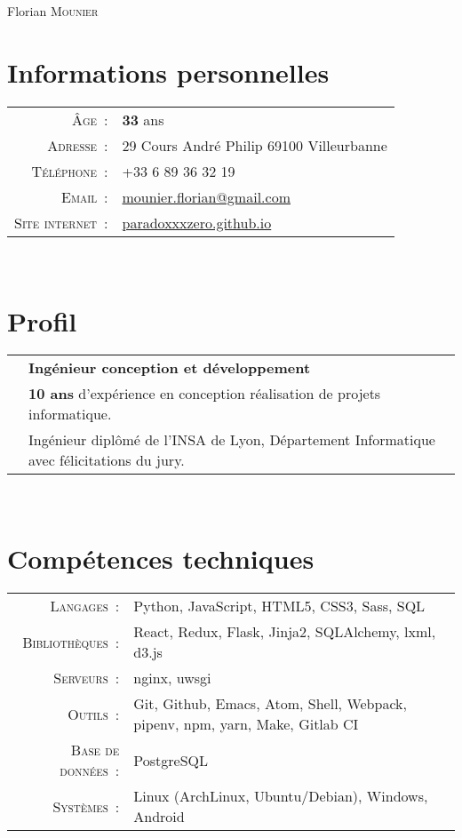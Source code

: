 \documentclass[a4paper,10pt]{article}
\begin{document}
\pagestyle{empty}
\par{\centering
  {\Huge Florian \textsc{Mounier}
  }\bigskip\par}

\section{Informations personnelles}
\begin{tabular}{rl}
  \textsc{Âge :}           & \textbf{33} ans \\
  \textsc{Adresse :}       & 29 Cours André Philip 69100 Villeurbanne \\
  \textsc{Téléphone :}     & +33 6 89 36 32 19 \\
  \textsc{Email :}         & \href{mailto:mounier.florian@gmail.com}{mounier.florian@gmail.com} \\
  \textsc{Site internet :} & \href{http://paradoxxxzero.github.com}{paradoxxxzero.github.io} \\
\end{tabular} \\

\section{Profil}
\begin{tabular}{rl}
  & \textbf {Ingénieur conception et développement} \\
  & \textbf{10 ans} d’expérience en conception réalisation de projets informatique. \\
  & Ingénieur diplômé de l’INSA de Lyon, Département Informatique avec félicitations du jury. \\
\end{tabular} \\

\section{Compétences techniques}
\begin{tabular}{rl}
  \textsc{Langages :}        & Python, JavaScript, HTML5, CSS3, Sass, SQL \\
  \textsc{Bibliothèques :}   & React, Redux, Flask, Jinja2, SQLAlchemy, lxml, d3.js \\
  \textsc{Serveurs :}        & nginx, uwsgi \\
  \textsc{Outils :}          & Git, Github, Emacs, Atom, Shell, Webpack, pipenv, npm, yarn, Make, Gitlab CI \\
  \textsc{Base de données :} & PostgreSQL \\
  \textsc{Systèmes :}        & Linux (ArchLinux, Ubuntu/Debian), Windows, Android \\
\end{tabular} \\
\end{document}
